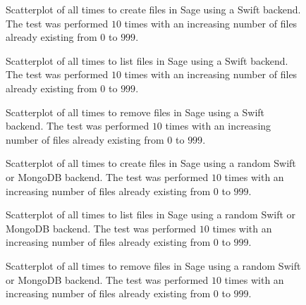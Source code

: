 \begin{figure}[!h]
\centering
{}
\caption[SageSwift Create Scatterplot]{Scatterplot of all times to create files in Sage using a Swift backend. The test was performed $10$ times with an increasing number of files already existing from $0$ to $999$.}
\label{fig:sageswiftcreatescatter}
\end{figure}

\begin{figure}[!h]
\centering
{}
\caption[SageSwift List Scatterplot]{Scatterplot of all times to list files in Sage using a Swift backend. The test was performed $10$ times with an increasing number of files already existing from $0$ to $999$.}
\label{fig:sageswiftlistscatter}
\end{figure}

\begin{figure}[!h]
\centering
{}
\caption[SageSwift Remove Scatterplot]{Scatterplot of all times to remove files in Sage using a Swift backend. The test was performed $10$ times with an increasing number of files already existing from $0$ to $999$.}
\label{fig:sageswiftremovescatter}
\end{figure}

\begin{figure}[!h]
\centering
{}
\caption[SageRandom Create Scatterplot]{Scatterplot of all times to create files in Sage using a random Swift or MongoDB backend. The test was performed $10$ times with an increasing number of files already existing from $0$ to $999$.}
\label{fig:sagerandomcreatescatter}
\end{figure}

\begin{figure}[!h]
\centering
{}
\caption[SageRandom List Scatterplot]{Scatterplot of all times to list files in Sage using a random Swift or MongoDB backend. The test was performed $10$ times with an increasing number of files already existing from $0$ to $999$.}
\label{fig:sagerandomlistscatter}
\end{figure}

\begin{figure}[!h]
\centering
{}
\caption[SageRandom Remove Scatterplot]{Scatterplot of all times to remove files in Sage using a random Swift or MongoDB backend. The test was performed $10$ times with an increasing number of files already existing from $0$ to $999$.}
\label{fig:sagerandomremovescatter}
\end{figure}


